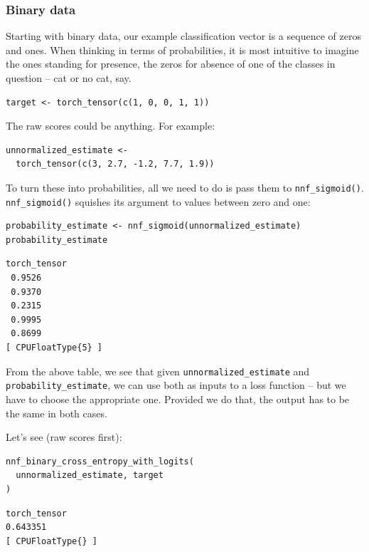 \documentclass[
  letterpaper,
]{krantz}
\begin{document}
\hypertarget{binary-data}{%
\subsubsection{\texorpdfstring{Binary
data}{Binary data}}\label{binary-data}}

Starting with binary data, our example classification vector is a
sequence of zeros and ones. When thinking in terms of probabilities, it
is most intuitive to imagine the ones standing for presence, the zeros
for absence of one of the classes in question -- cat or no cat, say.

\begin{verbatim}
target <- torch_tensor(c(1, 0, 0, 1, 1))
\end{verbatim}

The raw scores could be anything. For example:

\begin{verbatim}
unnormalized_estimate <-
  torch_tensor(c(3, 2.7, -1.2, 7.7, 1.9))
\end{verbatim}

To turn these into probabilities, all we need to do is pass them to
\texttt{nnf\_sigmoid()}. \texttt{nnf\_sigmoid()} squishes its argument
to values between zero and one:

\begin{verbatim}
probability_estimate <- nnf_sigmoid(unnormalized_estimate)
probability_estimate
\end{verbatim}

\begin{verbatim}
torch_tensor
 0.9526
 0.9370
 0.2315
 0.9995
 0.8699
[ CPUFloatType{5} ]
\end{verbatim}

From the above table, we see that given \texttt{unnormalized\_estimate}
and \texttt{probability\_estimate}, we can use both as inputs to a loss
function -- but we have to choose the appropriate one. Provided we do
that, the output has to be the same in both cases.

Let's see (raw scores first):

\begin{verbatim}
nnf_binary_cross_entropy_with_logits(
  unnormalized_estimate, target
)
\end{verbatim}

\begin{verbatim}
torch_tensor
0.643351
[ CPUFloatType{} ]
\end{verbatim}
\end{document}
